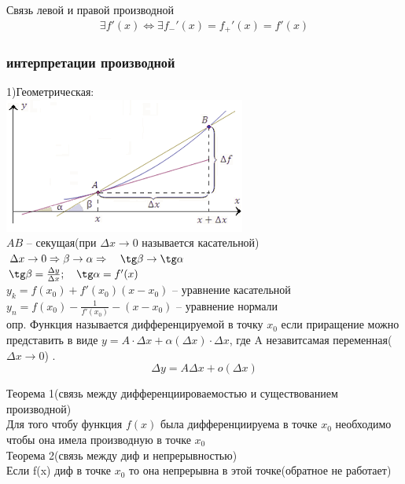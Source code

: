 \documentclass[a4paper, 12pt]{article}
\begin{document}
Связь левой и правой производной
\begin{align*}
  \exists f'(x) \Leftrightarrow \exists f_{-}'(x) = f_{+}'(x) = f'(x)
\end{align*}

\subsubsection{интерпретации производной}
1)Геометрическая:\\

\includegraphics{img/dif.png}\\
$ AB  $ -- секущая(при $ \Delta x  \to 0$ называется касательной) \\
$ \Delta x \to 0 \Rightarrow \beta  \to \alpha  \Rightarrow \quad  \tg \beta  \to \tg \alpha  $\\
$ \tg \beta  =  \frac{\Delta y}{\Delta x}; \quad  \tg \alpha  = f'(x) $\\
$ y_k = f(x_0) + f'(x_0)(x - x_0) $ -- уравнение касательной\\
$ y_n = f(x_0) - \frac{1}{f'(x_0)} - (x - x_0) $ -- уравнение нормали \\

опр. Функция называется дифференцируемой в точку $ x_0 $  если приращение можно представить в виде $ y = A \cdot \Delta x +\alpha (\Delta x) \cdot \Delta x $,  где A незавитсамая переменная($ \Delta x \to 0 $) . 
\[
     \Delta y = A \Delta x + o(\Delta x)
   \]   
   \begin{mdframed}[backgroundcolor=blue!20] 
          Теорема 1(связь между дифференциироваемостью и существованием производной)\\
          Для того чтобу функция $ f(x) $ была дифференциируема в точке $ x_0 $ необходимо чтобы она имела производную в точке $ x_0 $ \\

          Теорема 2(связь между диф и непрерывностью)\\
          Если f(x) диф в точке  $ x_0 $  то она непрерывна в этой точке(обратное не работает)\\
       \end{mdframed}
\end{document}
